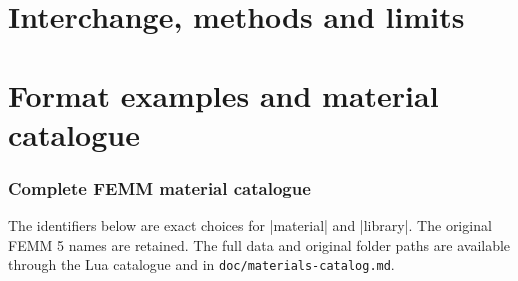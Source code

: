 \documentclass[a4paper,11pt]{ltxdoc}
\begin{document}
\part{Interchange, methods and limits}





\appendix
\part{Format examples and material catalogue}

\section{Complete FEMM material catalogue}
\label{sec:catalogue}
The identifiers below are exact choices for |material| and |library|.
The original FEMM 5 names are retained. The full data and original folder paths are available through
the Lua catalogue and in \texttt{doc/materials-catalog.md}.

\clearpage
\printindex
\end{document}
